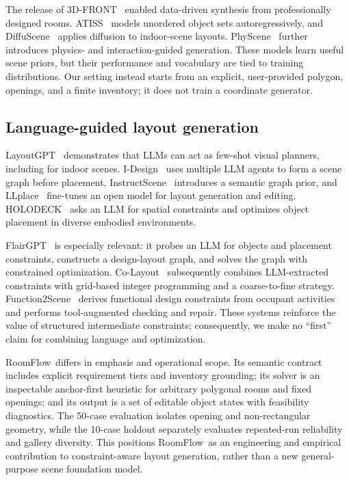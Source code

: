 \documentclass[pdflatex,sn-mathphys-num]{sn-jnl}
\newcommand{\method}{RoomFlow}
\begin{document}
The release of 3D-FRONT~\cite{fu20213dfront} enabled data-driven synthesis from professionally designed rooms. ATISS~\cite{paschalidou2021atiss} models unordered object sets autoregressively, and DiffuScene~\cite{tang2024diffuscene} applies diffusion to indoor-scene layouts. PhyScene~\cite{yang2024physcene} further introduces physics- and interaction-guided generation. These models learn useful scene priors, but their performance and vocabulary are tied to training distributions. Our setting instead starts from an explicit, user-provided polygon, openings, and a finite inventory; it does not train a coordinate generator.

\subsection{Language-guided layout generation}

LayoutGPT~\cite{feng2023layoutgpt} demonstrates that LLMs can act as few-shot visual planners, including for indoor scenes. I-Design~\cite{celen2024idesign} uses multiple LLM agents to form a scene graph before placement, InstructScene~\cite{lin2024instructscene} introduces a semantic graph prior, and LLplace~\cite{yang2024llplace} fine-tunes an open model for layout generation and editing. HOLODECK~\cite{yang2024holodeck} asks an LLM for spatial constraints and optimizes object placement in diverse embodied environments.

FlairGPT~\cite{littlefair2025flairgpt} is especially relevant: it probes an LLM for objects and placement constraints, constructs a design-layout graph, and solves the graph with constrained optimization. Co-Layout~\cite{xiang2025colayout} subsequently combines LLM-extracted constraints with grid-based integer programming and a coarse-to-fine strategy. Function2Scene~\cite{wang2026function2scene} derives functional design constraints from occupant activities and performs tool-augmented checking and repair. These systems reinforce the value of structured intermediate constraints; consequently, we make no ``first'' claim for combining language and optimization.

\method\ differs in emphasis and operational scope. Its semantic contract includes explicit requirement tiers and inventory grounding; its solver is an inspectable anchor-first heuristic for arbitrary polygonal rooms and fixed openings; and its output is a set of editable object states with feasibility diagnostics. The 50-case evaluation isolates opening and non-rectangular geometry, while the 10-case holdout separately evaluates repeated-run reliability and gallery diversity. This positions \method\ as an engineering and empirical contribution to constraint-aware layout generation, rather than a new general-purpose scene foundation model.
\end{document}
